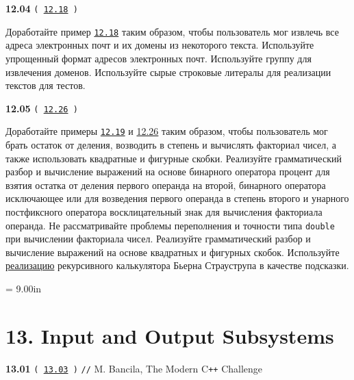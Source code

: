 \documentclass[a4paper,12pt]{article}
\begin{document}
\bigskip

{\large \textbf{12.04} \texttt{(\,\href{https://github.com/i-s-m-mipt/Education/blob/master/projects/examples/source/12.18.cpp}{12.18}\,)}}

\bigskip

Доработайте пример \href{https://github.com/i-s-m-mipt/Education/blob/master/projects/examples/source/12.18.cpp}{\texttt{12.18}} таким образом, чтобы пользователь мог извлечь все адреса электронных почт и их домены из некоторого текста. Используйте упрощенный формат адресов электронных почт. Используйте группу для извлечения доменов. Используйте сырые строковые литералы для реализации текстов для тестов.

\bigskip

{\large \textbf{12.05} \texttt{(\,\href{https://github.com/i-s-m-mipt/Education/blob/master/projects/examples/source/12.26.cpp}{12.26}\,)}}

\bigskip

Доработайте примеры \href{https://github.com/i-s-m-mipt/Education/blob/master/projects/examples/source/12.19.cpp}{\texttt{12.19}} и \href{https://github.com/i-s-m-mipt/Education/blob/master/projects/examples/source/12.26.cpp}{12.26} таким образом, чтобы пользователь мог брать остаток от деления, возводить в степень и вычислять факториал чисел, а также использовать квадратные и фигурные скобки. Реализуйте грамматический разбор и вычисление выражений на основе бинарного оператора процент для взятия остатка от деления первого операнда на второй, бинарного оператора исключающее или для возведения первого операнда в степень второго и унарного постфиксного оператора восклицательный знак для вычисления факториала операнда. Не рассматривайте проблемы переполнения и точности типа \lstinline{double} при вычислении факториала чисел. Реализуйте грамматический разбор и вычисление выражений на основе квадратных и фигурных скобок. Используйте \href{https://github.com/Chrinkus/stroustrup-ppp/blob/master/chapter07/ch07_calculator.cpp}{реализацию} рекурсивного калькулятора Бьерна Страуструпа в качестве подсказки.



\newpage\thispagestyle{empty}\pdfpageheight = 9.00in\enlargethispage{100in}

\section{13. Input and Output Subsystems}

{\large \textbf{13.01} \texttt{(\,\href{https://github.com/i-s-m-mipt/Education/blob/master/projects/examples/source/13.03.cpp}{13.03}\,)} \texttt{//} M. Bancila, The Modern C\texttt{++} Challenge}
\end{document}
